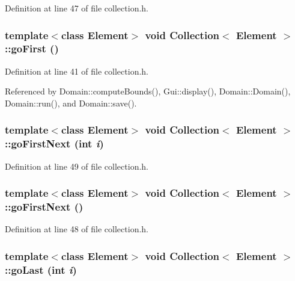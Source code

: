 Definition at line 47 of file collection.h.\hypertarget{classCollection_2abbefcde25d182a33c95d70a37139f9}{
\subsubsection[{goFirst}]{\setlength{\rightskip}{0pt plus 5cm}template$<$class Element$>$ void {\bf Collection}$<$ Element $>$::goFirst ()}}
\label{classCollection_2abbefcde25d182a33c95d70a37139f9}




Definition at line 41 of file collection.h.

Referenced by Domain::computeBounds(), Gui::display(), Domain::Domain(), Domain::run(), and Domain::save().\hypertarget{classCollection_43d729470bb3ede87a0c682ac032cec2}{
\subsubsection[{goFirstNext}]{\setlength{\rightskip}{0pt plus 5cm}template$<$class Element$>$ void {\bf Collection}$<$ Element $>$::goFirstNext (int {\em i})}}
\label{classCollection_43d729470bb3ede87a0c682ac032cec2}




Definition at line 49 of file collection.h.\hypertarget{classCollection_cb98f5d24cd1888894d5e219b6a125b5}{
\subsubsection[{goFirstNext}]{\setlength{\rightskip}{0pt plus 5cm}template$<$class Element$>$ void {\bf Collection}$<$ Element $>$::goFirstNext ()}}
\label{classCollection_cb98f5d24cd1888894d5e219b6a125b5}




Definition at line 48 of file collection.h.\hypertarget{classCollection_6729c15aabfe51403936a00551bcbaf7}{
\subsubsection[{goLast}]{\setlength{\rightskip}{0pt plus 5cm}template$<$class Element$>$ void {\bf Collection}$<$ Element $>$::goLast (int {\em i})}}
\label{classCollection_6729c15aabfe51403936a00551bcbaf7}




